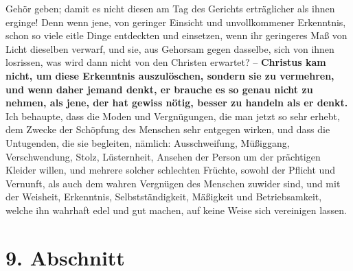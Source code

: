 Gehör geben;
damit es nicht diesen am Tag des Gerichts erträglicher
als ihnen erginge! Denn
wenn jene, von geringer Einsicht und unvollkommener Erkenntnis, schon so viele
eitle Dinge entdeckten und einsetzen, wenn ihr geringeres Maß von Licht
dieselben verwarf, und sie, aus Gehorsam gegen dasselbe, sich von ihnen
losrissen, was wird dann nicht von den Christen erwartet? --
\label{ref:14_08_wahre_nachfolger_rational}
\textbf{Christus kam nicht,
um diese Erkenntnis auszulöschen, sondern sie zu vermehren, und wenn daher
jemand denkt, er brauche es so genau nicht zu nehmen, als jene, der hat gewiss
nötig, besser zu handeln als er denkt.} Ich behaupte, dass die Moden und
Vergnügungen, die man jetzt so sehr erhebt, dem Zwecke der Schöpfung des
Menschen sehr entgegen wirken, und dass die Untugenden, die sie begleiten,
nämlich: Ausschweifung, Müßiggang,
Verschwendung, Stolz, Lüsternheit, Ansehen
der Person um der prächtigen Kleider willen, und mehrere solcher schlechten
Früchte, sowohl der Pflicht und Vernunft, als auch dem wahren Vergnügen des
Menschen zuwider sind, und mit der Weisheit, Erkenntnis, Selbstständigkeit,
Mäßigkeit und Betriebsamkeit, welche ihn wahrhaft edel und gut
machen, auf keine
Weise sich vereinigen lassen.

\section{9. Abschnitt} \label{kap14_ab9}


